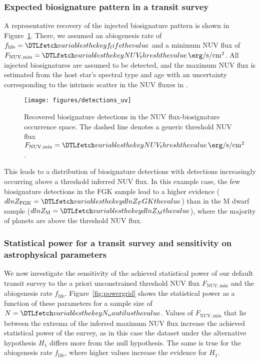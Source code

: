 \documentclass[twocolumn,twocolappendix,linenumbers]{aastex631}
\begin{document}
\subsubsection{Expected biosignature pattern in a transit survey}
A representative recovery of the injected biosignature pattern is shown in Figure~\ref{fig:detections_uv}.
There, we assumed an abiogenesis rate of $f_\mathrm{life} = \var{f_life}$ and a minimum \gls{NUV} flux of $F_\mathrm{NUV, min} = \var{NUV_thresh}\,\SI{}{\erg\per\second\per\centi\meter\squared}$.
All injected biosignatures are assumed to be detected, and the maximum \gls{NUV} flux is estimated from the host star's spectral type and age with an uncertainty corresponding to the intrinsic scatter in the \gls{NUV} fluxes in \citet{Richey-Yowell2023}.
\begin{figure*}
    \begin{centering}
        \texttt{[image: figures/detections\_uv]}
        \caption{Recovered biosignature detections in the \gls{NUV} flux-biosignature occurrence space. The dashed line denotes a generic threshold \gls{NUV} flux $F_\mathrm{NUV, min} = \var{NUV_thresh}\,\SI{}{\erg\per\second\per\centi\meter\squared}$.}
        \label{fig:detections_uv}
    \end{centering}
\end{figure*}
This leads to a distribution of biosignature detections with detections increasingly occurring above a threshold inferred NUV flux.
In this example case, the few biosignature detections in the FGK sample lead to a higher evidence ($dlnZ_\mathrm{FGK} = \var{dlnZ_FGK}$) than in the M dwarf sample ($dlnZ_\mathrm{M} = \var{dlnZ_M}$), where the majority of planets are above the threshold \gls{NUV} flux.


\subsubsection{Statistical power for a transit survey and sensitivity on astrophysical parameters}
We now investigate the sensitivity of the achieved statistical power of our default transit survey to the a priori unconstrained threshold \gls{NUV} flux $F_\mathrm{NUV, min}$ and the abiogenesis rate $f_\mathrm{life}$.
Figure~\ref{fig:powergrid} shows the statistical power as a function of these parameters for a sample size of $N=\var{N_nautilus}$.
Values of $F_\mathrm{NUV, min}$ that lie between the extrema of the inferred maximum \gls{NUV} flux increase the achieved statistical power of the survey, as in this case the dataset under the alternative hypothesis $H_1$ differs more from the null hypothesis.
The same is true for the abiogenesis rate $f_\mathrm{life}$, where higher values increase the evidence for $H_1$.
\end{document}
